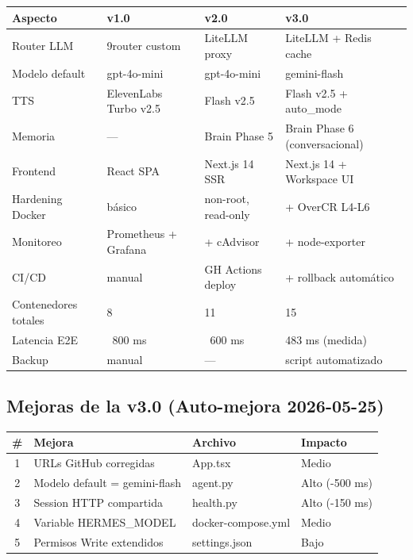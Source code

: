 \documentclass[11pt,a4paper]{article}
\begin{document}
\begin{center}
\begin{longtable}{|l|l|l|l|}
\hline
\rowcolor{hermesblue}\color{white}\textbf{Aspecto} & \color{white}\textbf{v1.0} & \color{white}\textbf{v2.0} & \color{white}\textbf{v3.0}\\
\hline
\endhead
Router LLM & 9router custom & LiteLLM proxy & LiteLLM + Redis cache\\
Modelo default & gpt-4o-mini & gpt-4o-mini & gemini-flash\\
TTS & ElevenLabs Turbo v2.5 & Flash v2.5 & Flash v2.5 + auto\_mode\\
Memoria & — & Brain Phase 5 & Brain Phase 6 (conversacional)\\
Frontend & React SPA & Next.js 14 SSR & Next.js 14 + Workspace UI\\
Hardening Docker & básico & non-root, read-only & + OverCR L4-L6\\
Monitoreo & Prometheus + Grafana & + cAdvisor & + node-exporter\\
CI/CD & manual & GH Actions deploy & + rollback automático\\
Contenedores totales & 8 & 11 & 15\\
Latencia E2E & ~800 ms & ~600 ms & 483 ms (medida)\\
Backup & manual & — & script automatizado\\
\hline
\end{longtable}
\end{center}

\subsection{Mejoras de la v3.0 (Auto-mejora 2026-05-25)}

\begin{center}
\begin{tabular}{|c|l|l|l|}
\hline
\rowcolor{hermesblue}\color{white}\textbf{\#} & \color{white}\textbf{Mejora} & \color{white}\textbf{Archivo} & \color{white}\textbf{Impacto}\\
\hline
1 & URLs GitHub corregidas & App.tsx & Medio\\
2 & Modelo default = gemini-flash & agent.py & Alto (-500 ms)\\
3 & Session HTTP compartida & health.py & Alto (-150 ms)\\
4 & Variable HERMES\_MODEL & docker-compose.yml & Medio\\
5 & Permisos Write extendidos & settings.json & Bajo\\
\hline
\end{tabular}
\end{center}
\end{document}

